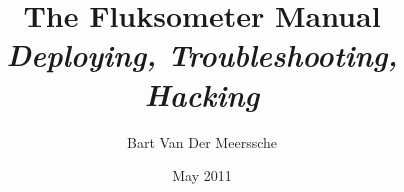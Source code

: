 


\title{
    The Fluksometer Manual\\
    \textit{Deploying, Troubleshooting, Hacking}\\
}
\author{Bart Van Der Meerssche}
\date{May 2011}



\frontmatter

\maketitle

\tableofcontents



\mainmatter



%
%
%

\appendix


